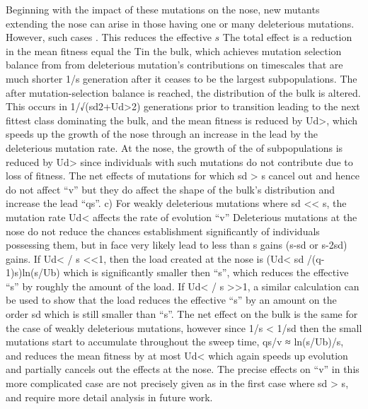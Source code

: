 \documentclass[12pt]{article}
\begin{document}
Beginning with the impact of these mutations on the nose, new mutants extending the nose can arise in those having one or many deleterious mutations. However, such cases .  This reduces the effective $s$ The total effect is a reduction in the mean fitness equal the Tin the bulk, which achieves mutation selection balance from from deleterious mutation's contributions on timescales that are much shorter 1/s generation after it ceases to be the largest subpopulations.
The after mutation-selection balance is reached, the distribution of the bulk is altered.  This occurs in 1/√(sd2+Ud>2) generations prior to transition leading to the next fittest class dominating the bulk, and the mean fitness is reduced by Ud>, which speeds up the growth of the nose through an increase in the lead by the deleterious mutation rate.
At the nose, the growth of the of subpopulations is reduced by Ud> since individuals with such mutations do not contribute due to loss of fitness.
The net effects of mutations for which sd > s cancel out and hence do not affect “v” but they do affect the shape of the bulk's distribution and increase the lead “qs”.
 c) For weakly deleterious mutations where sd << s, the mutation rate Ud< affects the rate of evolution “v”
Deleterious mutations at the nose do not reduce the chances establishment significantly of individuals possessing them, but in face very likely lead to less than s gains (s-sd or s-2sd) gains.
If Ud< / s <<1, then the load created at the nose is (Ud< sd /(q-1)s)ln(s/Ub) which is significantly smaller then “s”, which reduces the effective “s” by roughly the amount of the load.
If  Ud< / s >>1, a similar calculation can be used to show that the load reduces the effective “s” by an amount on the order sd which is still smaller than “s”.
The net effect on the bulk is the same for the case of weakly deleterious mutations, however since 1/s < 1/sd then the small mutations start to accumulate throughout the sweep time, qs/v ≈ ln(s/Ub)/s, and reduces the mean fitness by at most Ud< which again speeds up evolution and partially cancels out the effects at the nose.
The precise effects on “v” in this more complicated case are not precisely given as in the first case where  sd > s, and require more detail analysis in future work.
\end{document}
